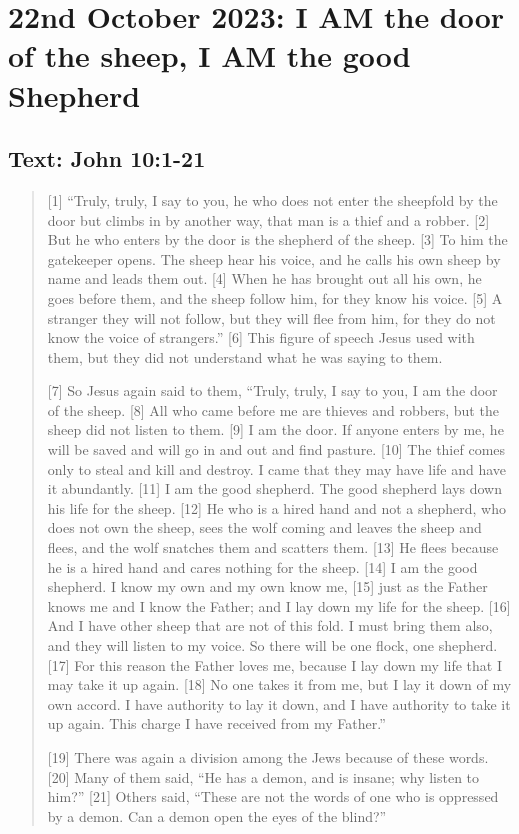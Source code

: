 \setcounter{figure}{0}

\section{22nd October 2023: I AM the door of the sheep, I AM the good Shepherd}
\subsection*{Text: John 10:1-21}
  \begin{quote}
  [1] “Truly, truly, I say to you, he who does not enter the sheepfold by the door but climbs in by another way, that man is a thief and a robber. [2] But he who enters by the door is the shepherd of the sheep. [3] To him the gatekeeper opens. The sheep hear his voice, and he calls his own sheep by name and leads them out. [4] When he has brought out all his own, he goes before them, and the sheep follow him, for they know his voice. [5] A stranger they will not follow, but they will flee from him, for they do not know the voice of strangers.” [6] This figure of speech Jesus used with them, but they did not understand what he was saying to them.

  [7] So Jesus again said to them, “Truly, truly, I say to you, I am the door of the sheep. [8] All who came before me are thieves and robbers, but the sheep did not listen to them. [9] I am the door. If anyone enters by me, he will be saved and will go in and out and find pasture. [10] The thief comes only to steal and kill and destroy. I came that they may have life and have it abundantly. [11] I am the good shepherd. The good shepherd lays down his life for the sheep. [12] He who is a hired hand and not a shepherd, who does not own the sheep, sees the wolf coming and leaves the sheep and flees, and the wolf snatches them and scatters them. [13] He flees because he is a hired hand and cares nothing for the sheep. [14] I am the good shepherd. I know my own and my own know me, [15] just as the Father knows me and I know the Father; and I lay down my life for the sheep. [16] And I have other sheep that are not of this fold. I must bring them also, and they will listen to my voice. So there will be one flock, one shepherd. [17] For this reason the Father loves me, because I lay down my life that I may take it up again. [18] No one takes it from me, but I lay it down of my own accord. I have authority to lay it down, and I have authority to take it up again. This charge I have received from my Father.”

  [19] There was again a division among the Jews because of these words. [20] Many of them said, “He has a demon, and is insane; why listen to him?” [21] Others said, “These are not the words of one who is oppressed by a demon. Can a demon open the eyes of the blind?”
  \end{quote}
